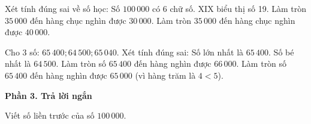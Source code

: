 \begin{ex} %
Xét tính đúng sai về số học:
\choiceTF
{\True Số $100\,000$ có 6 chữ số.}
{\True $\text{XIX}$ biểu thị số 19.}
{Làm tròn $35\,000$ đến hàng chục nghìn được $30\,000$.}
{\True Làm tròn $35\,000$ đến hàng chục nghìn được $40\,000$.}
\end{ex}

\begin{ex} %
Cho 3 số: $65\,400; 64\,500; 65\,040$. Xét tính đúng sai:
\choiceTF
{\True Số lớn nhất là $65\,400$.}
{\True Số bé nhất là $64\,500$.}
{Làm tròn số $65\,400$ đến hàng nghìn được $66\,000$.}
{\True Làm tròn số $65\,400$ đến hàng nghìn được $65\,000$ (vì hàng trăm là $4 < 5$).}
\end{ex}

\textbf{Phần 3. Trả lời ngắn}

\begin{ex} %
Viết số liền trước của số $100\,000$.
\end{ex}

